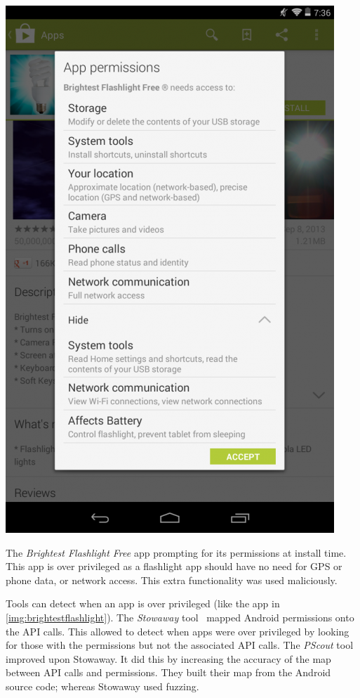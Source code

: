 \documentclass[a4paper,sfsidenotes]{%
  scrartcl%
}
\begin{document}
\begin{marginfigure}
  \centering
  \includegraphics[width=\smallmarginlength]{img/brightestflashlight.png}
  \caption[The Brightest Flashlight Free app]{The \emph{Brightest Flashlight Free} app prompting for its permissions
    at install time. This app is over privileged as a flashlight app should have
    no need for GPS or phone data, or network access.  This extra functionality
  was used maliciously.}
\label{img:brightestflashlight}
\end{marginfigure}

Tools can detect when an app is over privileged (like the app in
\autoref{img:brightestflashlight}). The \emph{Stowaway}
tool~\cite{Felt:2011kj} mapped Android permissions onto the API calls. This
allowed \citeauthor*{Felt:2011kj} to detect when apps were over privileged by
looking for those with the permissions but not the associated API calls. The
\emph{PScout} tool~\cite{Au:2012ju} improved upon Stowaway.  It did this by
increasing the accuracy of the map between API calls and permissions. They built
their map from the Android source code; whereas Stowaway used fuzzing.
\end{document}
